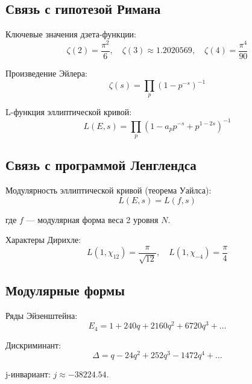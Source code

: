 \documentclass[12pt,a4paper,twoside]{article}
\theoremstyle{definition}
\begin{document}
\subsection{Связь с гипотезой Римана}

Ключевые значения дзета-функции:
\begin{equation}
\zeta(2) = \frac{\pi^2}{6}, \quad \zeta(3) \approx 1.2020569, \quad \zeta(4) = \frac{\pi^4}{90}
\label{eq:zeta}
\end{equation}

Произведение Эйлера:
\begin{equation}
\zeta(s) = \prod_{p} (1 - p^{-s})^{-1}
\label{eq:euler_product}
\end{equation}

L-функция эллиптической кривой:
\begin{equation}
L(E, s) = \prod_{p} (1 - a_p p^{-s} + p^{1-2s})^{-1}
\label{eq:l_function}
\end{equation}

\subsection{Связь с программой Ленглендса}

Модулярность эллиптической кривой (теорема Уайлса):
\begin{equation}
L(E, s) = L(f, s)
\label{eq:modularity}
\end{equation}

где $f$ — модулярная форма веса 2 уровня $N$.

Характеры Дирихле:
\begin{equation}
L(1, \chi_{12}) = \frac{\pi}{\sqrt{12}}, \quad L(1, \chi_{-4}) = \frac{\pi}{4}
\label{eq:dirichlet}
\end{equation}

\subsection{Модулярные формы}

Ряды Эйзенштейна:
\begin{equation}
E_4 = 1 + 240q + 2160q^2 + 6720q^3 + \ldots
\label{eq:eisenstein}
\end{equation}

Дискриминант:
\begin{equation}
\Delta = q - 24q^2 + 252q^3 - 1472q^4 + \ldots
\label{eq:discriminant}
\end{equation}

j-инвариант: $j \approx -38224.54$.
\end{document}
